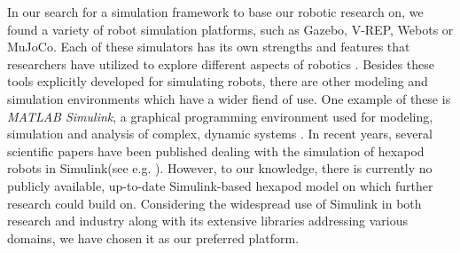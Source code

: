 In our search for a simulation framework to base our robotic research on, we found a variety of robot simulation platforms, such as Gazebo, V-REP, Webots or MuJoCo. 
Each of these simulators has its own strengths and features that researchers have utilized to explore different aspects of robotics \parencite{de2019analysis, collins2021review}.
Besides these tools explicitly developed for simulating robots, there are other modeling and simulation environments which have a wider fiend of use.
One example of these is \textit{MATLAB Simulink\textsuperscript{\textregistered}}, a graphical programming environment used for modeling, simulation and analysis of complex, dynamic systems \parencite{Simulink}.
In recent years, several scientific papers have been published dealing with the simulation of hexapod robots in Simulink(see e.g. \cite{tanaka2019development, barai2013smart, atify2019propelling}).
However, to our knowledge, there is currently no publicly available, up-to-date Simulink-based hexapod model on which further research could build on.
Considering the widespread use of Simulink in both research and industry along with its extensive libraries addressing various domains, we have chosen it as our preferred platform.



